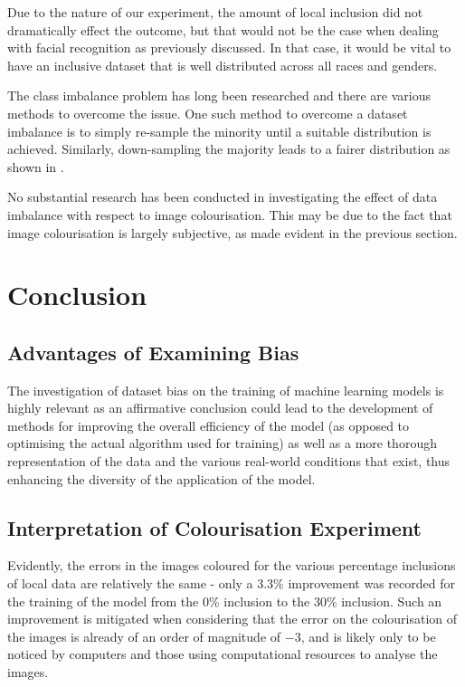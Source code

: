 \documentclass[conference]{IEEEtran}
\begin{document}
Due to the nature of our experiment, the amount of local inclusion did not dramatically effect the outcome, but that would not be the case when dealing with facial recognition as previously discussed. In that case, it would be vital to have an inclusive dataset that is well distributed across all races and genders.

The class imbalance problem has long been researched and there are various methods \cite{japkowicz2000class} to overcome the issue. One such method to overcome a dataset imbalance is to simply re-sample the minority until a suitable distribution is achieved. Similarly, down-sampling the majority leads to a fairer distribution as shown in \cite{japkowicz2000class}. 

No substantial research has been conducted in investigating the effect of data imbalance with respect to image colourisation. This may be due to the fact that image colourisation is largely subjective, as made evident in the previous section.

\section{Conclusion}

%
%
%
\subsection{Advantages of Examining Bias}

The investigation of dataset bias on the training of machine learning models is highly relevant as an affirmative conclusion could lead to the development of methods for improving the overall efficiency of the model (as opposed to optimising the actual algorithm used for training) as well as a more thorough representation of the data and the various real-world conditions that exist, thus enhancing the diversity of the application of the model.

\subsection{Interpretation of Colourisation Experiment}

Evidently, the errors in the images coloured for the various percentage inclusions of local data are relatively the same - only a 3.3\% improvement was recorded for the training of the model from the 0\% inclusion to the 30\% inclusion. Such an improvement is mitigated when considering that the error on the colourisation of the images is already of an order of magnitude of $-3$, and is likely only to be noticed by computers and those using computational resources to analyse the images.
\end{document}
